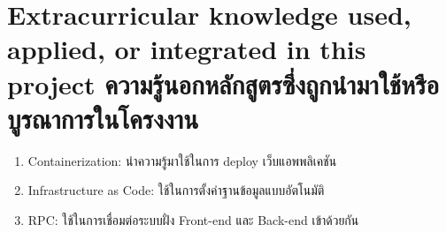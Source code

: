 \section{\ifenglish%
        Extracurricular knowledge used, applied, or integrated in this project
  \else%
        ความรู้นอกหลักสูตรซึ่งถูกนำมาใช้หรือบูรณาการในโครงงาน
  \fi
 }
\begin{enumerate}
      \item Containerization: นำความรู้มาใช้ในการ deploy เว็บแอพพลิเคชัน
      \item Infrastructure as Code: ใช้ในการตั้งค่าฐานข้อมูลแบบอัตโนมัติ
      \item RPC: ใช้ในการเชื่อมต่อระบบฝั่ง Front-end และ Back-end เข้าด้วยกัน
\end{enumerate}

